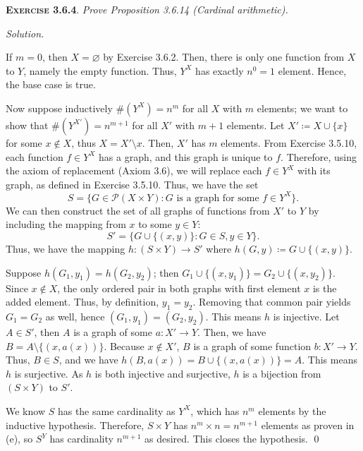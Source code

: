 \documentclass[12pt]{article}
\theoremstyle{remark}
\newenvironment{exer}[2]{
    \noindent \setlength{\parskip}{1em}%
    \textsc{\textbf{Exercise #1}}. \textit{#2} \par
    \noindent \textit{Solution.} %
}{\bigskip}
\begin{document}
\begin{exer}{3.6.4}{
    Prove Proposition 3.6.14 (Cardinal arithmetic).
}
\begin{enumerate}[topsep=0mm,label=(\alph*)]
            If $m = 0$, then $X = \varnothing$ by Exercise 3.6.2.
            Then, there is only one function from $X$ to $Y$, namely the empty function.
            Thus, $Y^X$ has exactly $n^0 = 1$ element.
            Hence, the base case is true.

            Now suppose inductively $\#(Y^X) = n^m$ for all $X$ with $m$ elements;
            we want to show that $\#(Y^{X'}) = n^{m+1}$ for all $X'$ with $m+1$ elements.
            Let $X' \coloneqq X \cup \{ x \}$ for some $x \notin X$, thus $X = X' \setminus x$.
            Then, $X'$ has $m$ elements.
            From Exercise 3.5.10, each function $f \in Y^X$ has a graph, and this graph is unique to $f$.
            Therefore, using the axiom of replacement (Axiom 3.6), we will replace each $f \in Y^X$ with its graph, as defined in Exercise 3.5.10.
            Thus, we have the set
            \[
                S = \{G \in \mathcal{P}(X \times Y) : G \text{ is a graph for some } f \in Y^X \}.
            \]
            We can then construct the set of all graphs of functions from $X'$ to $Y$ by including the mapping from $x$ to some $y \in Y$:
            \[
                S' = \{G \cup \{(x, y)\} : G \in S, y \in Y \}.
            \]
            Thus, we have the mapping $h : (S \times Y) \to S'$ where $h(G, y) \coloneqq G \cup \{ (x, y) \}$.
            
            Suppose $h(G_1, y_1) = h(G_2, y_2)$; then $G_1 \cup \{ (x, y_1) \} = G_2 \cup \{ (x, y_2) \}$.
            Since $x \notin X$, the only ordered pair in both graphs with first element $x$ is the added element.
            Thus, by definition, $y_1 = y_2$.
            Removing that common pair yields $G_1 = G_2$ as well, hence $(G_1, y_1) = (G_2, y_2)$.
            This means $h$ is injective.
            Let $A \in S'$, then $A$ is a graph of some $a : X' \to Y$.
            Then, we have $B = A \setminus \{(x, a(x))\}$.
            Because $x \notin X'$, $B$ is a graph of some function $b : X' \to Y$.
            Thus, $B \in S$, and we have $h(B, a(x)) = B \cup \{ (x, a(x)) \} = A$.
            This means $h$ is surjective.
            As $h$ is both injective and surjective, $h$ is a bijection from $(S \times Y)$ to $S'$.
            
            We know $S$ has the same cardinality as $Y^X$, which has $n^m$ elements by the inductive hypothesis.
            Therefore, $S \times Y$ has $n^m \times n = n^{m + 1}$ elements as proven in (e), so $S^Y$ has cardinality $n^{m + 1}$ as desired.
            This closes the hypothesis. \qed
    \end{enumerate}
\end{exer}
\end{document}
